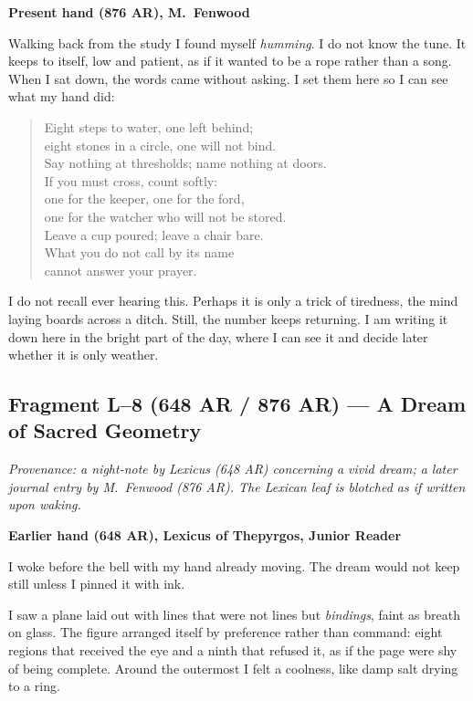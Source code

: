 \documentclass[11pt]{article}
\begin{document}
\medskip
\noindent\textbf{Present hand (876 AR), M.\ Fenwood}

Walking back from the study I found myself \emph{humming}. I do not know the tune. It keeps to itself, low and patient, as if it wanted to be a rope rather than a song. When I sat down, the words came without asking. I set them here so I can see what my hand did:

\begin{verse}
Eight steps to water, one left behind;\\
eight stones in a circle, one will not bind.\\
Say nothing at thresholds; name nothing at doors.\\
If you must cross, count softly:\\
one for the keeper, one for the ford,\\
one for the watcher who will not be stored.\\
Leave a cup poured; leave a chair bare.\\
What you do not call by its name\\
cannot answer your prayer.
\end{verse}

I do not recall ever hearing this. Perhaps it is only a trick of tiredness, the mind laying boards across a ditch. Still, the number keeps returning. I am writing it down here in the bright part of the day, where I can see it and decide later whether it is only weather.

\subsection{Fragment L--8 (648 AR / 876 AR) --- A Dream of Sacred Geometry}
\label{frag:l8}
{}

\noindent\textit{Provenance: a night-note by Lexicus (648 AR) concerning a vivid dream; a later journal entry by M.\ Fenwood (876 AR). The Lexican leaf is blotched as if written upon waking.}

\medskip
\noindent\textbf{Earlier hand (648 AR), Lexicus of Thepyrgos, Junior Reader}

I woke before the bell with my hand already moving. The dream would not keep still unless I pinned it with ink.

I saw a plane laid out with lines that were not lines but \emph{bindings}, faint as breath on glass. The figure arranged itself by preference rather than command: eight regions that received the eye and a ninth that refused it, as if the page were shy of being complete. Around the outermost I felt a coolness, like damp salt drying to a ring.
\end{document}
